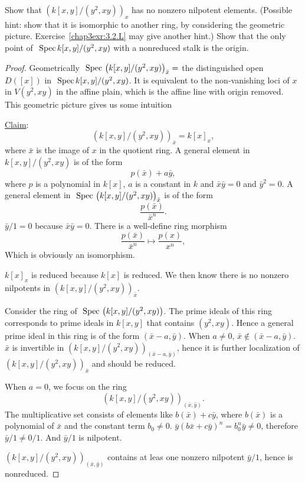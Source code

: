 \documentclass[11pt,fleqn]{book} %
\begin{document}
\begin{exr}
Show that  $\left(k[x, y]/(y^2, xy)\right)_x$  has no nonzero nilpotent elements.
(Possible hint: show that it is isomorphic to another ring, by considering the geometric picture. Exercise~\ref{chap3exr:3.2.L} may give another hint.) Show that the only point of $\text{ Spec\,} k[x, y]/(y^2 , xy)$ with a nonreduced stalk is the origin.

\end{exr}
\begin{proof}
Geometrically $\text{ Spec\,} \left(k[x, y]/(y^2, xy)\right)_{\bar{x}}=$ the distinguished open $D([x])$ in $\text{ Spec\,} k[x, y]/(y^2, xy)$. It is equivalent to the non-vanishing loci of $x$ in $V(y^2,xy)$ in the affine plain, which is the affine line with origin removed. This geometric picture gives us some intuition

\underline{Claim}:
$$
\left(k[x, y]/(y^2, xy)\right)_{\bar{x}}=k[x]_{x},
$$
where $\bar{x}$ is the image of $x$ in the quotient ring. A general element in $k[x, y]/(y^2, xy)$ is of the form
$$
p(\bar{x})+a\bar{y},
$$
where $p$ is a polynomial in $k[x]$, $a$ is a constant in $k$ and $\bar{x}\bar{y}=0$ and $\bar{y}^2=0$.
A general element in $\text{ Spec\,} \left(k[x, y]/(y^2, xy)\right)_{\bar{x}}$ is of the form
$$
\frac{p(\bar{x})}{\bar{x}^n}.
$$
$\bar{y}/1=0$ because $\bar{x}\bar{y}=0$.
 There is a well-define ring morphism
$$
\frac{p(\bar{x})}{\bar{x}^n}\mapsto \frac{p(x)}{x^n},
$$
Which is obviously an isomorphism.

$k[x]_x$ is reduced because $k[x]$ is reduced. We then know there is no nonzero nilpotents in $\left(k[x, y]/(y^2, xy)\right)_{\bar{x}}$.

Consider the ring of $\text{ Spec\,} \left(k[x, y]/(y^2, xy)\right)$. The prime ideals of this ring corresponds to prime ideals in $k[x,y]$ that contains $(y^2,xy)$. Hence a general prime ideal in this ring is of the form $(\bar{x}-a, \bar{y})$. 
When $a\neq 0$, $\bar{x}\notin (\bar{x}-a,\bar{y})$. $\bar{x}$ is invertible in $\left(k[x, y]/(y^2, xy)\right)_{(\bar{x}-a,\bar{y})}$, hence it is further localization of $\left(k[x, y]/(y^2, xy)\right)_{\bar{x}}$ and should be reduced.

When $a=0$, we focus on the ring
$$
\left(k[x, y]/(y^2, xy)\right)_{(\bar{x},\bar{y})}.
$$
The multiplicative set consists of elements like $b(\bar{x})+c\bar{y}$, where $b(\bar{x})$ is a polynomial of $\bar{x}$ and the constant term $b_0\neq 0$. $\bar{y}(b\bar{x}+c\bar{y})^n=b_0^n\bar{y}\neq 0$, therefore $\bar{y}/1\neq 0/1$. And $\bar{y}/1$ is nilpotent.

$\left(k[x, y]/(y^2, xy)\right)_{(\bar{x},\bar{y})}$ contains at leas one nonzero nilpotent $\bar{y}/1$, hence is nonreduced.
\end{proof}
\end{document}
